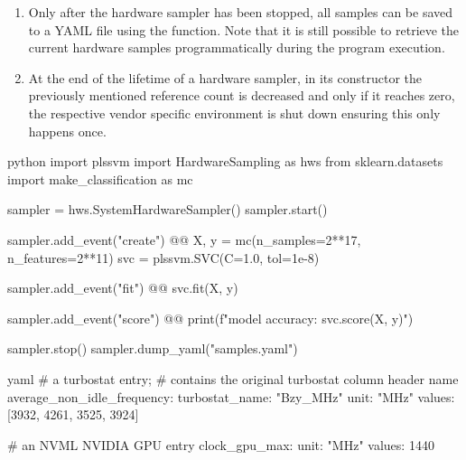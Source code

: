 \begin{enumerate}
    Note that once a hardware sampler has been stopped, it cannot be started again. 
    \item%
    Only after the hardware sampler has been stopped, all samples can be saved to a YAML file using the  function. 
    Note that it is still possible to retrieve the current hardware samples programmatically during the program execution.
    \item%
    At the end of the lifetime of a hardware sampler, in its constructor the previously mentioned reference count is decreased and only if it reaches zero, the respective vendor specific environment is shut down ensuring this only happens once. 
\end{enumerate}


\begin{listing}
    \begin{moderncode}[highlightlines={2, 5-6, 18-19}]{python}
import plssvm
import HardwareSampling as hws
from sklearn.datasets import make_classification as mc

sampler = hws.SystemHardwareSampler()
sampler.start()

sampler.add_event("create") @\label{code:hws_example:event_create}@
X, y = mc(n_samples=2**17, n_features=2**11)
svc = plssvm.SVC(C=1.0, tol=1e-8)

sampler.add_event("fit") @\label{code:hws_example:event_fit}@
svc.fit(X, y)

sampler.add_event("score") @\label{code:hws_example:event_score}@
print(f"model accuracy: {svc.score(X, y)}")

sampler.stop()
sampler.dump_yaml("samples.yaml")
    \end{moderncode}
    \caption{%
    A code example showing the simplicity of the hws library. 
    With only five required lines of code, it is possible to gather information from the whole system during the classification task.%
    Additionally, events can be added to make the final output easier to understand and post-process (see lines \ref{code:hws_example:event_create}, \ref{code:hws_example:event_fit}, and \ref{code:hws_example:event_score}).
    }
    \label{code:hws_example}
\end{listing}

\begin{listing}
    \begin{moderncode}{yaml}
# a turbostat entry;
# contains the original turbostat column header name
average_non_idle_frequency:
    turbostat_name: "Bzy_MHz"
    unit: "MHz"
    values: [3932, 4261, 3525, 3924]

# an NVML NVIDIA GPU entry
clock_gpu_max:
    unit: "MHz"
    values: 1440
    \end{moderncode}
    \caption{%
    Explanatory YAML entries.%
    Note that the comments are not output in the YAML file but are only added to this example as a means for easier explanation. 
    }
    \label{code:hws_yaml}
\end{listing}

